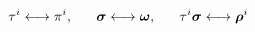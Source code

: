 \begin{equation}
\tau^{i} \longleftrightarrow \pi^{i},~~~~~
\mbox{\boldmath $\sigma$} \longleftrightarrow \mbox{\boldmath $\omega$},~~~~~
\tau^{i} \mbox{\boldmath $\sigma$} \longleftrightarrow \mbox{\boldmath $\rho$}^{i}
\end{equation}

